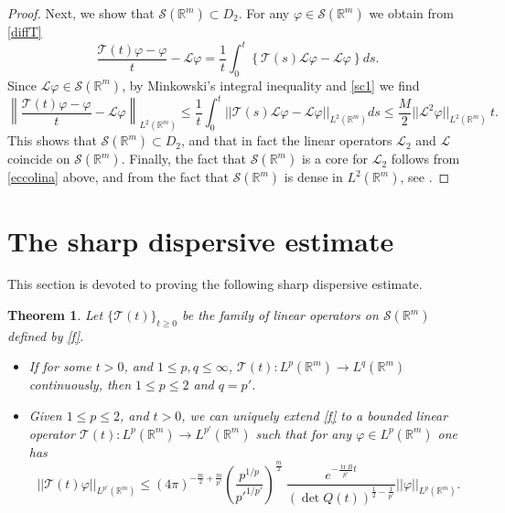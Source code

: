 \documentclass[11pt,a4paper]{amsart}
\def \vf{\varphi}
\def \So {\mathscr{S}(\Rm)}
\newcommand{\Rm}{\mathbb R^m}
\numberwithin{equation}{section}
\newcommand{\tr}{\operatorname{tr}}
\newtheorem{theorem}{Theorem}[section]
\numberwithin{equation}{section}
\begin{document}
\begin{proof}
Next, we show that $\So\subset D_2$.
For any $\vf\in \So$ we obtain from \eqref{diffT}
\[
\frac{\mathcal T(t) \vf - \vf}t - \mathscr L \vf  = \frac 1t \int_0^t \left\{\mathcal T(s)  \mathscr L \vf - \mathscr L \vf\right\} ds.
\]
Since $\mathscr L \vf\in \So$, by Minkowski's integral inequality and  \eqref{sc1} we find
\[
\left\|\frac{\mathcal T(t) \vf - \vf}t - \mathscr L \vf \right\|_{L^2(\Rm)} \le \frac 1t \int_0^t ||\mathcal T(s)  \mathscr L \vf - \mathscr L \vf||_{L^2(\Rm)} ds \le \frac M2 ||\mathscr L^2 \vf||_{L^2(\Rm)} \ t.
\]
This shows  that $\So \subset D_2$, and that in fact the  linear operators $\mathscr L_2$  and $\mathscr L$ coincide on $\So$. Finally, the fact that $\So$ is a core for $\mathscr L_2$ follows from \eqref{eccolina} above, and from the fact that $\So$ is dense in $L^2(\Rm)$, see \cite[Proposition 1.7, p. 39]{EN}.


\end{proof}









\section{The sharp dispersive estimate}\label{S:main}


This section is devoted to proving the following sharp dispersive estimate.


\begin{theorem}\label{T:fest}
Let $\{\mathcal T(t)\}_{t\ge 0}$ be the family of linear operators on $\So$ defined by \eqref{f}. 
\begin{itemize}
\item[(i)] If for some $t>0$, and $1\le p, q\le \infty$, $\mathcal T(t) : L^p(\Rm)\to L^{q}(\Rm)$ continuously, then  $1\le p\le 2$ and $q = p'$. 
\item[(ii)] Given $1\le p \le 2$, and $t>0$, we can uniquely extend \eqref{f} to a bounded linear operator $\mathcal T(t) : L^p(\Rm)\to L^{p'}(\Rm)$ such that for any $\vf\in L^p(\Rm)$ one has
\begin{equation}\label{fe}
||\mathcal T(t) \vf||_{L^{p'}(\Rm)} \le (4\pi
)^{-\frac{m}{2}+\frac{m}{p'}} \left(\frac{p^{1/p}}{{p'}^{1/p'}}\right)^{\frac m2} \ \frac{e^{-\frac{\tr B}{p'} t}}{(\det Q(t))^{\frac 12 - \frac 1{p'}}} ||\vf||_{L^p(\Rm)}.
\end{equation}
\end{itemize}
\end{theorem}
\end{document}
